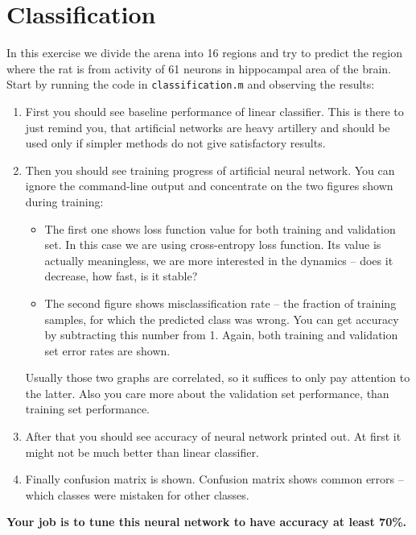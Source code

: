 \documentclass[a4paper,11pt]{article}
\begin{document}
\newpage

%
%
\section{Classification}

In this exercise we divide the arena into 16 regions and try to predict the region where the rat is from activity of 61 neurons in hippocampal area of the brain.\\

Start by running the code in \texttt{classification.m} and observing the results:

\begin{enumerate}
	\item First you should see baseline performance of linear classifier. This is there to just remind you, that artificial networks are heavy artillery and should be used only if simpler methods do not give satisfactory results. 
	\item Then you should see training progress of artificial neural network. You can ignore the command-line output and concentrate on the two figures shown during training:
	\begin{itemize}
		\item The first one shows loss function value for both training and validation set. In this case we are using cross-entropy loss function. Its value is actually meaningless, we are more interested in the dynamics -- does it decrease, how fast, is it stable?
		\item The second figure shows misclassification rate -- the fraction of training samples, for which the predicted class was wrong. You can get accuracy by subtracting this number from 1. Again, both training and validation set error rates are shown.
	\end{itemize}
	Usually those two graphs are correlated, so it suffices to only pay attention to the latter. Also you care more about the validation set performance, than training set performance.
	\item After that you should see accuracy of neural network printed out. At first it might not be much better than linear classifier.
	\item Finally confusion matrix is shown. Confusion matrix shows common errors -- which classes were mistaken for other classes.
\end{enumerate}

\textbf{Your job is to tune this neural network to have accuracy at least 70\%.}\\
\end{document}
